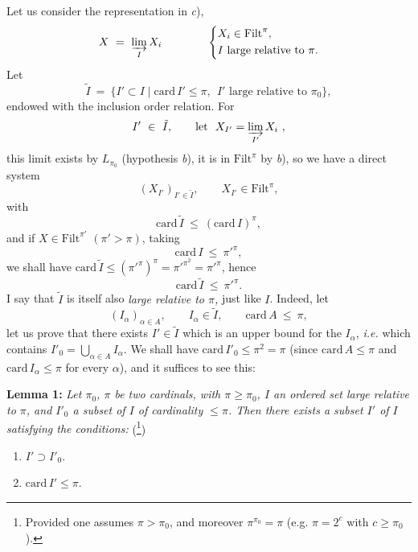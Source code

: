 \documentclass[11pt]{article}
\newcommand{\msp}[1]{\marginpar{\footnotesize [#1]}}
\newcommand{\Filt}{\mathrm{Filt}}
\newcommand{\card}{\mathrm{card}\,}
\begin{document}
Let us consider the representation in \textit{c}),
\[
X \ = \ \varinjlim_{I} X_i \qquad\qquad
\left\{
\begin{aligned}
& X_i \in \Filt^{\pi},\\
& I \text{ large relative to } \pi.
\end{aligned}
\right.
\]
Let
\[
\tilde{I} \ = \ \{I' \subset I \mid \card I' \leq \pi,\ \ I' \text{ large relative to } \pi_0\},
\]
endowed with the inclusion order relation. For
\[
I' \ \in\ \tilde{I}, \qquad \text{let}\ \ X_{I'} = \varinjlim_{I'} X_i\ ,
\]
this limit exists by $L_{\pi_0}$ (hypothesis \textit{b}), it is in $\Filt^{\pi}$ by \textit{b}), so we have a direct system
\[
(X_{I'})_{I' \in \tilde{I}}, \qquad X_{I'} \in \Filt^{\pi},
\]
with
\[
\card \tilde{I} \ \leq\ (\card I)^{\pi},
\]
and if $X \in \Filt^{\pi'}$ $(\pi' > \pi)$, taking
\[
\card I \ \leq\ \pi'^{\pi},
\]
we shall have $\card \tilde{I} \leq (\pi'^{\pi})^{\pi} = \pi'^{\pi^2} = \pi'^{\pi}$, hence
\[
\card \tilde{I} \ \leq\ \pi'^{\pi}.
\]
I say that $\tilde{I}$ is itself also \textit{large relative to $\pi$,} just like $I$. Indeed,
\msp{page 80}
let
\[
(I_\alpha)_{\alpha \in A}, \qquad I_\alpha \in \tilde{I}, \qquad \card A \ \leq\ \pi,
\]
let us prove that there exists $I' \in \tilde{I}$ which is an upper bound for the $I_\alpha$, \textit{i.e.} which contains $I'_0 = \bigcup_{\alpha \in A} I_\alpha$. We shall have $\card I'_0 \leq \pi^2 = \pi$ (since $\card A \leq \pi$ and $\card I_\alpha \leq \pi$ for every $\alpha$), and it suffices to see this:



\textbf{Lemma 1:} \textit{Let $\pi_0$, $\pi$ be two cardinals, with $\pi \geq \pi_0$, $I$ an ordered set large relative to $\pi$, and $I'_0$ a subset of $I$ of cardinality $\leq \pi$. Then there exists a subset $I'$ of $I$ satisfying the conditions:} (\footnote[40]{Provided one assumes $\pi > \pi_0$, and moreover $\pi^{\pi_0} = \pi$ (e.g. $\pi = 2^c$ with $c \geq \pi_0$).})

\begin{enumerate}
\item[a)] $I' \supset I'_0$.
\item[b)] $\card I' \leq \pi$.
\end{enumerate}
\end{document}
